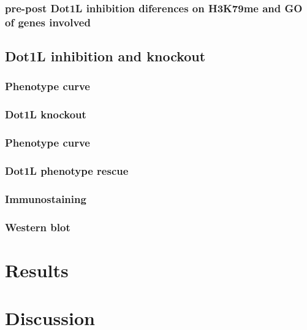 \documentclass[11pt,twoside,a4paper]{report}
\begin{document}
		\subsection{pre-post Dot1L inhibition diferences on H3K79me and GO of genes involved}

	\section{Dot1L inhibition and knockout}
		\subsection{Phenotype curve}
		\subsection{Dot1L knockout}
		\subsection{Phenotype curve}
		\subsection{Dot1L phenotype rescue}

		\subsection{Immunostaining}
		\subsection{Western blot}


\clearpage


\chapter{Results}



\clearpage

\chapter{Discussion}
\end{document}
